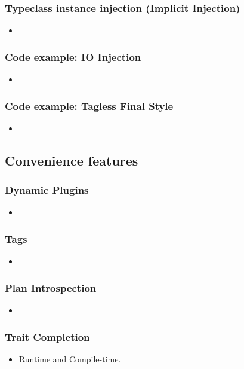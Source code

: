 \documentclass[usenames,dvipsnames]{beamer}
\begin{document}
\begin{frame}
\frametitle{Typeclass instance injection (Implicit Injection)}
\begin{itemize}
\item 
\end{itemize}
\end{frame}

\begin{frame}
\frametitle{Code example: IO Injection}
\begin{itemize}
\item 
\end{itemize}
\end{frame}

\begin{frame}
\frametitle{Code example: Tagless Final Style}
\begin{itemize}
\item 
\end{itemize}
\end{frame}

\subsection{Convenience features}

\begin{frame}
\frametitle{Dynamic Plugins}
\begin{itemize}
\item 
\end{itemize}
\end{frame}

\begin{frame}
\frametitle{Tags}
\begin{itemize}
\item 
\end{itemize}
\end{frame}

\begin{frame}
\frametitle{Plan Introspection}
\begin{itemize}
\item 
\end{itemize}
\end{frame}

\begin{frame}
\frametitle{Trait Completion}
\begin{itemize}
\item Runtime and Compile-time.
\end{itemize}
\end{frame}
\end{document}
